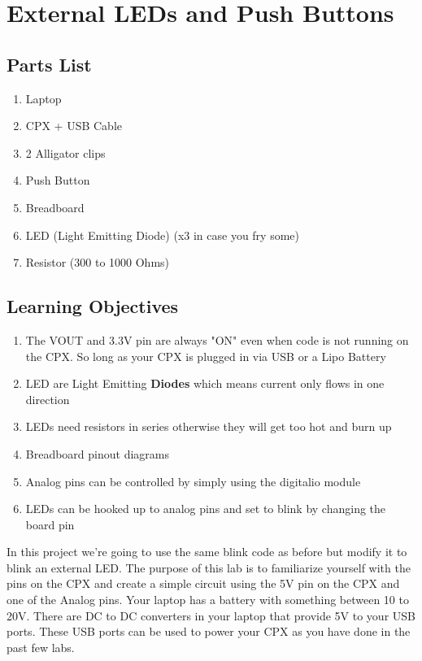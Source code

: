 \newpage

\section{External LEDs and Push Buttons}

\subsection{Parts List}

\begin{enumerate}[itemsep=-5pt]
  \item Laptop
  \item CPX + USB Cable
  \item 2 Alligator clips
  \item Push Button
  \item Breadboard
  \item LED (Light Emitting Diode) (x3 in case you fry some)
  \item Resistor (300 to 1000 Ohms)
\end{enumerate}

\subsection{Learning Objectives}

\begin{enumerate}[itemsep=-5pt]
\item The VOUT and 3.3V pin are always "ON" even when code is not
  running on the CPX. So long as your CPX is plugged in via USB or a
  Lipo Battery
\item LED are Light Emitting {\bf Diodes} which means current only flows in one direction
\item LEDs need resistors in series otherwise they will get too hot and burn up
\item Breadboard pinout diagrams
\item Analog pins can be controlled by simply using the digitalio module
\item LEDs can be hooked up to analog pins and set to blink by changing the board pin
\end{enumerate}

In this project we’re going to use the same blink code as before but
modify it to blink an external LED. The purpose of this lab is to
familiarize yourself with the pins on the CPX and create a simple
circuit using the 5V pin on the CPX and one of the Analog pins. Your
laptop has a battery with something between 10 to 20V. There are DC to
DC converters in your laptop that provide 5V to your USB ports. These
USB ports can be used to power your CPX as you have done in the past
few labs.

